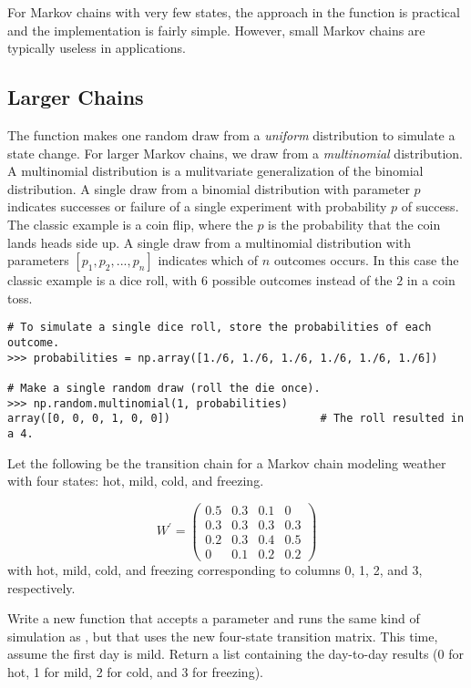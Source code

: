 For Markov chains with very few states, the approach in the  function is practical and the implementation is fairly simple.
However, small Markov chains are typically useless in applications.

\subsection*{Larger Chains}

The  function makes one random draw from a \emph{uniform} distribution to simulate a state change.
For larger Markov chains, we draw from a \emph{multinomial} distribution.
A multinomial distribution is a mulitvariate generalization of the binomial distribution.
A single draw from a binomial distribution with parameter $p$ indicates successes or failure of a single experiment with probability $p$ of success.
The classic example is a coin flip, where the $p$ is the probability that the coin lands heads side up.
A single draw from a multinomial distribution with parameters $\left[p_1, p_2, ..., p_n \right]$ indicates which of $n$ outcomes occurs.
In this case the classic example is a dice roll, with $6$ possible outcomes instead of the $2$ in a coin toss.

\begin{lstlisting}
# To simulate a single dice roll, store the probabilities of each outcome.
>>> probabilities = np.array([1./6, 1./6, 1./6, 1./6, 1./6, 1./6])

# Make a single random draw (roll the die once).
>>> np.random.multinomial(1, probabilities)         
array([0, 0, 0, 1, 0, 0])                       # The roll resulted in a 4.
\end{lstlisting}

\begin{problem}
Let the following be the transition chain for a Markov chain modeling weather with four states: hot, mild, cold, and freezing.

\[ W^\prime = \left( \begin{array}{cccc}
0.5 & 0.3 & 0.1 & 0\\
0.3 & 0.3 & 0.3 & 0.3\\
0.2 & 0.3 & 0.4 & 0.5\\
  0 & 0.1 & 0.2 & 0.2\end{array} \right)\]
with hot, mild, cold, and freezing corresponding to columns 0, 1, 2, and 3, respectively.

Write a new function that accepts a parameter  and runs the same kind of simulation as , but that uses the new four-state transition matrix.
This time, assume the first day is mild.
Return a list containing the day-to-day results (0 for hot, 1 for mild, 2 for cold, and 3 for freezing).
\label{problem:transition}
\end{problem}

